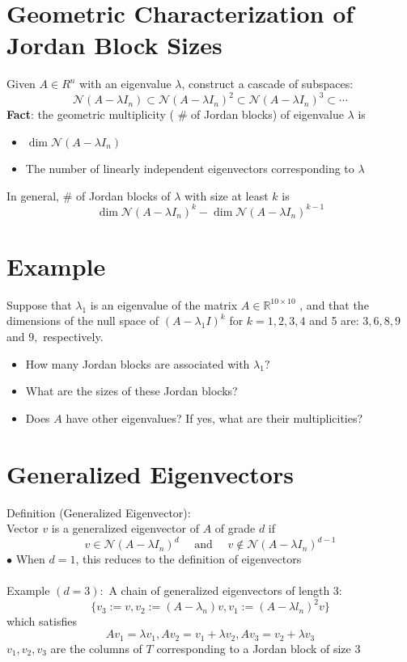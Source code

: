 \documentclass[10pt,a4paper,oneside]{article}
\begin{document}
\section{Geometric Characterization of Jordan Block Sizes}
Given $A\in R^n$ with an eigenvalue $\lambda$, construct a cascade of subspaces:
\[
\mathcal{N}\left(A-\lambda I_{n}\right) \subset \mathcal{N}\left(A-\lambda I_{n}\right)^{2} \subset \mathcal{N}(A-\lambda I_n)^{3} \subset \cdots
\]
{\bfseries Fact}: the geometric multiplicity ( $\#$ of Jordan blocks) of eigenvalue $\lambda$ is
\begin{itemize}
\item $\operatorname{dim} \mathcal{N}\left(A-\lambda I_{n}\right)$
\item The number of linearly independent eigenvectors corresponding to $\lambda$
\end{itemize}
In general, $\#$ of Jordan blocks of $\lambda$ with size at least $k$ is
\[
\operatorname{dim} \mathcal{N}\left(A-\lambda I_{n}\right)^{k}-\operatorname{dim} \mathcal{N}\left(A-\lambda I_{n}\right)^{k-1}
\]
\section{Example}
Suppose that $\lambda_{1}$ is an eigenvalue of the matrix $A \in \mathbb{R}^{10 \times 10}$ , and that the dimensions of the null space of $\left(A-\lambda_{1} I\right)^{k}$ for $k=1,2,3,4$ and 5 are:
$3,6,8,9$ and $9,$ respectively.
\begin{itemize}
\item How many Jordan blocks are associated with $\lambda_{1} ?$
\item What are the sizes of these Jordan blocks?
\item Does $A$ have other eigenvalues? If yes, what are their multiplicities?
\end{itemize}
\section{Generalized Eigenvectors}
Definition (Generalized Eigenvector):\\
Vector $v$ is a generalized eigenvector of $A$ of grade $d$ if
\[
v \in \mathcal{N}(A-\lambda I_n)^{d} \quad \text { and } \quad v \notin \mathcal{N}(A-\lambda I_n)^{d-1}
\]
$\bullet$ When $d=1$, this reduces to the definition of eigenvectors\\
\\
Example $(d=3) :$ A chain of generalized eigenvectors of length 3:
\[
\{v_{3} :=v, v_{2} :=\left(A-\lambda_{n}\right) v, v_{1} :=\left(A-\lambda l_{n}\right)^{2} v\}
\]
which satisfies
\[
A v_{1}=\lambda v_{1}, A v_{2}=v_{1}+\lambda v_{2}, A v_{3}=v_{2}+\lambda v_{3}
\]
$v_{1}, v_{2}, v_{3}$ are the columns of $T$ corresponding to a Jordan block of size 3
\end{document}
